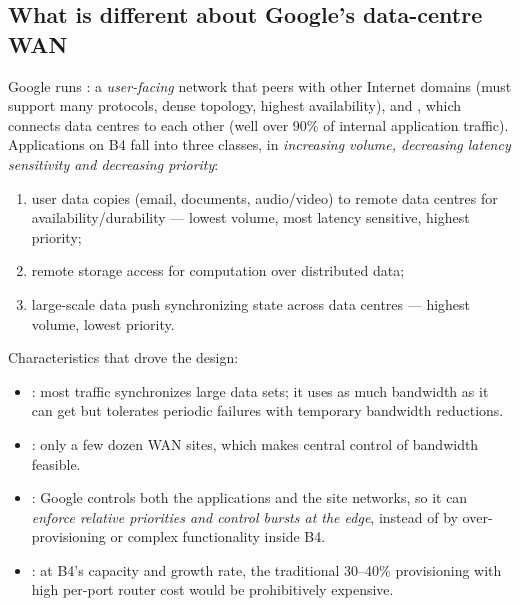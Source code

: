 \subsection{What is different about Google's data-centre WAN}
Google runs : a \emph{user-facing} network that peers with other Internet domains (must support many protocols, dense topology, highest availability), and , which connects data centres to each other (well over 90\% of internal application traffic). Applications on B4 fall into three classes, in \emph{increasing volume, decreasing latency sensitivity and decreasing priority}:
\begin{enumerate}
\item user data copies (email, documents, audio/video) to remote data centres for availability/durability --- lowest volume, most latency sensitive, highest priority;
\item remote storage access for computation over distributed data;
\item large-scale data push synchronizing state across data centres --- highest volume, lowest priority.
\end{enumerate}
Characteristics that drove the design:
\begin{itemize}
\item {}: most traffic synchronizes large data sets; it uses as much bandwidth as it can get but tolerates periodic failures with temporary bandwidth reductions.
\item {}: only a few dozen WAN sites, which makes central control of bandwidth feasible.
\item {}: Google controls both the applications and the site networks, so it can \emph{enforce relative priorities and control bursts at the edge}, instead of by over-provisioning or complex functionality inside B4.
\item {}: at B4's capacity and growth rate, the traditional 30--40\% provisioning with high per-port router cost would be prohibitively expensive.
\end{itemize}

